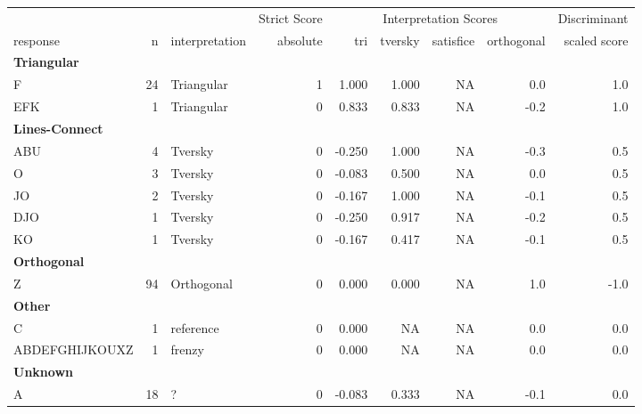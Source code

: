 \documentclass[
  letterpaper,
  DIV=11,
  numbers=noendperiod]{scrreprt}
\begin{document}
\begin{tabular}[t]{l|r|l|r|r|r|r|r|r}
\hline
\multicolumn{3}{c|}{ } & \multicolumn{1}{c|}{Strict Score} & \multicolumn{4}{c|}{Interpretation Scores} & \multicolumn{1}{c}{Discriminant} \\
\cline{4-4} \cline{5-8} \cline{9-9}
response & n & interpretation & absolute & tri & tversky & satisfice & orthogonal & scaled score\\
\hline
\multicolumn{9}{l}{\textbf{Triangular}}\\
\hline
\hspace{1em}F & 24 & Triangular & 1 & 1.000 & 1.000 & NA & 0.0 & 1.0\\
\hline
\hspace{1em}EFK & 1 & Triangular & 0 & 0.833 & 0.833 & NA & -0.2 & 1.0\\
\hline
\multicolumn{9}{l}{\textbf{Lines-Connect}}\\
\hline
\hspace{1em}ABU & 4 & Tversky & 0 & -0.250 & 1.000 & NA & -0.3 & 0.5\\
\hline
\hspace{1em}O & 3 & Tversky & 0 & -0.083 & 0.500 & NA & 0.0 & 0.5\\
\hline
\hspace{1em}JO & 2 & Tversky & 0 & -0.167 & 1.000 & NA & -0.1 & 0.5\\
\hline
\hspace{1em}DJO & 1 & Tversky & 0 & -0.250 & 0.917 & NA & -0.2 & 0.5\\
\hline
\hspace{1em}KO & 1 & Tversky & 0 & -0.167 & 0.417 & NA & -0.1 & 0.5\\
\hline
\multicolumn{9}{l}{\textbf{Orthogonal}}\\
\hline
\hspace{1em}Z & 94 & Orthogonal & 0 & 0.000 & 0.000 & NA & 1.0 & -1.0\\
\hline
\multicolumn{9}{l}{\textbf{Other}}\\
\hline
\hspace{1em}C & 1 & reference & 0 & 0.000 & NA & NA & 0.0 & 0.0\\
\hline
\hspace{1em}ABDEFGHIJKOUXZ & 1 & frenzy & 0 & 0.000 & NA & NA & 0.0 & 0.0\\
\hline
\multicolumn{9}{l}{\textbf{Unknown}}\\
\hline
\hspace{1em}A & 18 & ? & 0 & -0.083 & 0.333 & NA & -0.1 & 0.0\\

\end{tabular}
\end{document}
